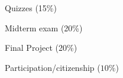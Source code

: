 \documentclass[10pt]{article}
\begin{document}
\noindent Quizzes (15\%)%

\noindent Midterm exam (20\%)

\noindent Final Project (20\%)%

\noindent Participation/citizenship ($10\%$) %


\end{document}
